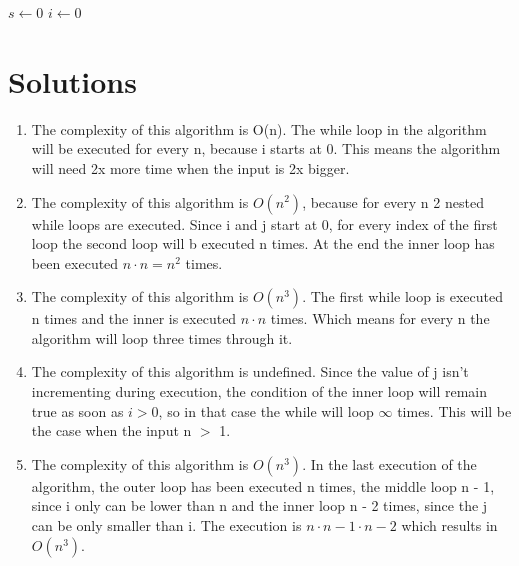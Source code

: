 \documentclass{article}
\begin{document}
\begin{algorithm}
\DontPrintSemicolon
{}
  $s \leftarrow 0$\;
  $i \leftarrow 0$\;
 \caption{}
\end{algorithm}

\newpage
\section*{Solutions}
\begin{enumerate}
    \item The complexity of this algorithm is O(n). The while loop in the algorithm will be executed for every n, because i starts at 0. This means the algorithm will need 2x more time when the input is 2x bigger.
    \item The complexity of this algorithm is $O(n^2)$, because for every n 2 nested while loops are executed. Since i and j start at 0, for every index of the first loop the second loop will b executed n times. At the end the inner loop has been executed $n \cdot n = n^2$ times.
    \item The complexity of this algorithm is $O(n^3)$. The first while loop is executed n times and the inner is executed $n \cdot n$ times. Which means for every n the algorithm will loop three times through it.
    \item The complexity of this algorithm is undefined. Since the value of j isn't incrementing during execution, the condition of the inner loop will remain true as soon as $i > 0$, so in that case the while will loop $\infty$ times. This will be the case when the input n $>$ 1.
    \item The complexity of this algorithm is $O(n^3)$. In the last execution of the algorithm, the outer loop has been executed n times, the middle loop n - 1, since i only can be lower than n and the inner loop n - 2 times, since the j can be only smaller than i. The execution is $n \cdot n - 1 \cdot n - 2 $ which results in $O(n^3)$.
\end{enumerate}
\end{document}
